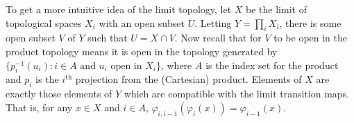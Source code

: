       To get a more intuitive idea of the limit topology, let $X$ be the limit of topological spaces $X_i$ with an open subset $U$.
      Letting $Y=\prod_i X_i$, there is some open subset $V$ of $Y$ such that $U=X\cap V$.
      Now recall that for $V$ to be open in the product topology means it is open in the topology generated by $\{p_i^{-1}(u_i):i\in A\text{ and }u_i\text{ open in }X_i\}$, where $A$ is the index set for the product and $p_i$ is the $i^\text{th}$ projection from the (Cartesian) product.
      Elements of $X$ are exactly those elements of $Y$ which are compatible with the limit transition maps.
      That is, for any $x\in X$ and $i\in A$, $\varphi_{i,i-1}(\varphi_i(x))=\varphi_{i-1}(x)$.


      


